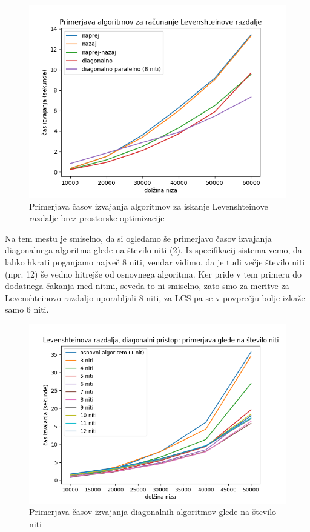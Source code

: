 \documentclass[a4paper,12pt,openright]{book}
\begin{document}
\begin{figure}[htb]
\begin{center}
\includegraphics[width=1.0\textwidth]{plots/LevenshteinTotal.png}
\end{center}
\caption{Primerjava časov izvajanja algoritmov za iskanje Levenshteinove razdalje brez prostorske optimizacije}
\label{comparison4}
\end{figure}

Na tem mestu je smiselno, da si ogledamo še primerjavo časov izvajanja diagonalnega algoritma glede na število niti (\ref{comparison5}). Iz specifikacij sistema vemo, da lahko hkrati poganjamo največ 8 niti, vendar vidimo, da je tudi večje število niti (npr. 12) še vedno hitrejše od osnovnega algoritma. Ker pride v tem primeru do dodatnega čakanja med nitmi, seveda to ni smiselno, zato smo za meritve za Levenshteinovo razdaljo uporabljali 8 niti, za LCS pa se v povprečju bolje izkaže samo 6 niti. 

\begin{figure}[htb]
\begin{center}
\includegraphics[width=1.0\textwidth]{plots/nThreads.png}
\end{center}
\caption{Primerjava časov izvajanja diagonalnih algoritmov glede na število niti}
\label{comparison5}
\end{figure}
\end{document}
